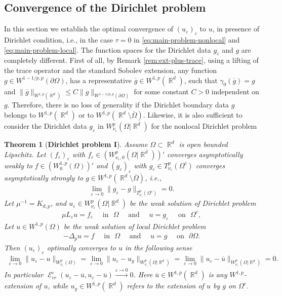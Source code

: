 \documentclass[12pt, reqno]{amsart}%
\theoremstyle{plain}  %
\newtheorem{theorem}{Theorem}[section]
\theoremstyle{definition}  %
\numberwithin{equation}{section}
\DeclareMathOperator{\cE}{\mathcal{E}}
\DeclareMathOperator{\R}{\mathbb{R}}
\newcommand{\eps}{\varepsilon}
\newcommand{\WnuOmRa}{W^p_{\nu_\eps}(\Omega|\R^d )}
\newcommand{\TnuOma}{T^p_{\nu_\eps} (\Omega^c)}
\begin{document}
\subsection{Convergence of the Dirichlet problem}
In this section we establish the optimal convergence of $(u_\eps)_\eps$ to $u$, in presence of Dirichlet condition, i.e., in  the case $\tau=0$ in \eqref{eq:main-problem-nonlocal} and \eqref{eq:main-problem-local}.  The function spaces for the Dirichlet data  $g_\eps$ and $g$ are completely different.  First of all, by Remark \ref{rem:ext-plus-trace}, using a lifting of the trace operator and the standard Sobolev extension, any  function $g\in W^{1-1/p , p}(\partial \Omega)$, has a representative $\overline{g}\in W^{1,p}(\R^d)$, such that $\gamma_0(\overline{g})= g$ and
$\|\overline{g}\|_{ W^{1, p}(\R^d)}
\leq C\|g\|_{ W^{1-1/p , p}(\partial \Omega)}$ for some constant $C>0$ independent on $g$. Therefore, there is no loss of generality  if the  Dirichlet boundary data $g$ belongs to $ W^{1,p}(\R^d)$ or to $W^{1,p}(\R^d\setminus\overline{\Omega})$. Likewise,  it is also  sufficient to consider the Dirichlet data  $g_\eps$ in $\WnuOmRa$ for the nonlocal Dirichlet problem
\begin{theorem}[\textbf{Dirichlet problem I}]\label{thm:converg-dirichlet}
Assume $\Omega\subset \R^d$ is open bounded Lipschitz.   Let $ (f_\eps)_\eps$ with  $f_\eps\in  (W^{p}_{\nu_\eps,0}(\Omega|\R^d))'$ converges asymptotically weakly to $f\in (W^{1,p}_0(\Omega))'$ and $ (g_\eps)_\eps$ with $g_\eps\in  T^{p}_{\nu_\eps}(\Omega^c)$ converges asymptotically strongly to $g\in W^{1,p}(\R^d\setminus\overline{\Omega})$, i.e.,
\begin{align*}
\lim_{\eps\to0}	\|g_\eps-g\|_{\TnuOma}=0.
\end{align*}
Let $\mu^{-1}=K_{d,p}$, and $u_\eps \in  \WnuOmRa$ be the  weak solution of Dirichlet problem
\begin{align*}
\mu L_\eps u = f_\eps \quad \text{ in } \,\, \Omega
\quad \text{ and } \quad u = g_\eps
\quad \text{ on }\,\, \Omega^c ,
\end{align*}
 Let  $u \in W^{1,p}(\Omega)$ be  the weak solution of local Dirichlet problem
\begin{align*}
-\Delta_p u = f \quad \text{ in } \,\, \Omega \quad\text{ and }\quad
u = g \quad \text{ on } \,\, \partial\Omega.
\end{align*}
\noindent Then $(u_\eps)_\eps$ optimally converges to $u$ in the following sense
\begin{align*}
\lim_{\eps\to0}\|u_{\eps}-u\|_{W^p_{\nu_\eps}(\Omega)}= \lim_{\eps\to0}\|u_{\eps}-u_g\|_{W^p_{\nu_\eps}(\Omega|\R^d)} =\lim_{\eps\to0}\|u_{\eps}-\overline{u}\|_{W^p_{\nu_\eps}(\Omega| \R^d)}=0.
\end{align*}
In particular $\cE^\eps_{cr}(u_\eps-\overline{u}, u_\eps-\overline{u})\xrightarrow{\eps\to0}0$. Here $\overline{u}\in W^{1,p}(\R^d)$ is any $W^{1,p}$-extension of $u$,  while $u_g\in W^{1,p}(\R^d)$ refers to the extension of  $u$ by $g$ on $\Omega^c$.
\end{theorem}
\end{document}
